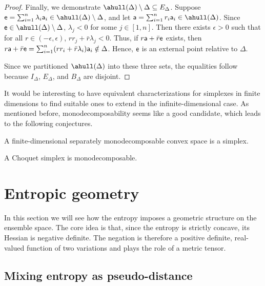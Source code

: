 \begin{mathSection}
\begin{proof}
	Finally, we demonstrate $\ahull(\Delta) \setminus \Delta \subseteq E_{\Delta}$. Suppose $\ens[e] = \sum_{i=1}^n \lambda_i\ens[a]_i \in \ahull(\Delta) \setminus \Delta$, and let $\ens[a] = \sum_{i=1}^n r_i\ens[a]_i \in \ahull(\Delta)$. Since $\ens[e] \in \ahull(\Delta) \setminus \Delta$, $\lambda_j < 0$ for some $j \in [1,n]$. Then there exists $\epsilon > 0$ such that for all $r \in (-\epsilon, \epsilon)$, $rr_j + \bar{r}\lambda_j < 0$. Thus, if $r\ens[a] + \bar{r}\ens[e]$ exists, then $r\ens[a] + \bar{r}\ens[e] = \sum_{i=1}^n (rr_i + \bar{r}\lambda_i)\ens[a]_i \notin \Delta$. Hence, $\ens[e]$ is an external point relative to $\Delta$.
	
	Since we partitioned $\ahull(\Delta)$ into these three sets, the equalities follow because $I_{\Delta}$, $E_{\Delta}$, and $B_{\Delta}$ are disjoint.
\end{proof}
\end{mathSection}

It would be interesting to have equivalent characterizations for simplexes in finite dimensions to find suitable ones to extend in the infinite-dimensional case. As mentioned before, monodecomposability seems like a good candidate, which leads to the following conjectures.

\begin{conj}\label{em-es-conjSimplexMonodecomposable}
	A finite-dimensional separately monodecomposable convex space is a simplex.
\end{conj}

\begin{conj}\label{em-es-conjChoquetSimplexMonodecomposable}
	A Choquet simplex is monodecomposable.
\end{conj}

\section{Entropic geometry}

In this section we will see how the entropy imposes a geometric structure on the ensemble space. The core idea is that, since the entropy is strictly concave, its Hessian is negative definite. The negation is therefore a positive definite, real-valued function of two variations and plays the role of a metric tensor.

\subsection{Mixing entropy as pseudo-distance}

